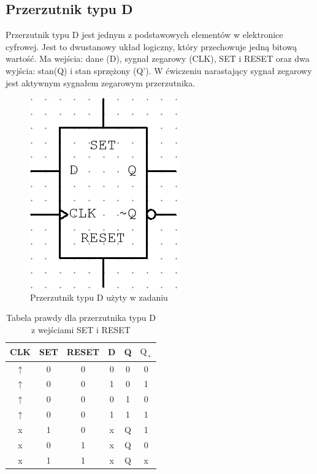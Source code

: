 \documentclass{article}
\begin{document}
    \subsection{Przerzutnik typu D}
    Przerzutnik typu D jest jednym z podstawowych elementów w elektronice cyfrowej. Jest to dwustanowy układ logiczny, 
    który przechowuje jedną bitową wartość. Ma wejścia: dane (D), sygnał zegarowy (CLK), SET i RESET oraz dwa wyjścia: stan(Q)
    i stan sprzężony (Q'). W ćwiczeniu narastający sygnał zegarowy jest aktywnym sygnałem zegarowym przerzutnika.
    \begin{figure}[H]
        \centering
        \captionsetup{font=small, skip=2pt}
        \includegraphics{images/dff}
        \caption{Przerzutnik typu D użyty w zadaniu}
    \end{figure}
    \begin{table}[H]
        \centering
        \captionsetup{font=small, skip=2pt}
        \caption{Tabela prawdy dla przerzutnika typu D z wejściami SET i RESET}
        \begin{tabular}{|c|c|c|c|c|c|}
            \hline
            CLK & SET & RESET & D & Q & \(\mbox{Q}_+\) \\
            \hline
            \(\uparrow\) & 0 & 0 & 0 & 0 & 0 \\
            \(\uparrow\) & 0 & 0 & 1 & 0 & 1 \\
            \(\uparrow\) & 0 & 0 & 0 & 1 & 0 \\
            \(\uparrow\) & 0 & 0 & 1 & 1 & 1 \\
            x & 1 & 0 & x & Q & 1 \\
            x & 0 & 1 & x & Q & 0 \\
            x & 1 & 1 & x & Q & x \\
            \hline
        \end{tabular}
    \end{table}
\end{document}
